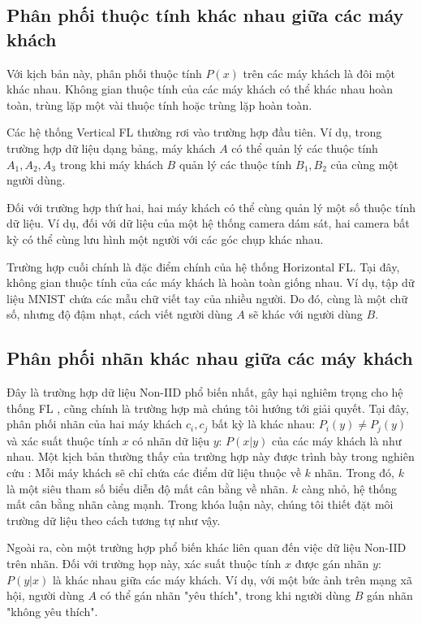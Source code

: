 \subsection{Phân phối thuộc tính khác nhau giữa các máy khách}

Với kịch bản này, phân phối thuộc tính $P(x)$ trên các máy khách là đôi một khác nhau. Không gian thuộc tính của các máy khách có thể khác nhau hoàn toàn, trùng lặp một vài thuộc tính hoặc trùng lặp hoàn toàn.

Các hệ thống Vertical FL thường rơi vào trường hợp đầu tiên. Ví dụ, trong trường hợp dữ liệu dạng bảng, máy khách $A$ có thể quản lý các thuộc tính $A_1, A_2, A_3$ trong khi máy khách $B$ quản lý các thuộc tính $B_1, B_2$ của cùng một người dùng.

Đối với trường hợp thứ hai, hai máy khách có thể cùng quản lý một số thuộc tính dữ liệu. Ví dụ, đối với dữ liệu của một hệ thống camera dám sát, hai camera bất kỳ có thể cùng lưu hình một người với các góc chụp khác nhau.

Trường hợp cuối chính là đặc điểm chính của hệ thống Horizontal FL. Tại đây, không gian thuộc tính của các máy khách là hoàn toàn giống nhau. Ví dụ, tập dữ liệu MNIST chứa các mẫu chữ viết tay của nhiều người. Do đó, cùng là một chữ số, nhưng độ đậm nhạt, cách viết người dùng $A$ sẽ khác với người dùng $B$.

\subsection{Phân phối nhãn khác nhau giữa các máy khách}

Đây là trường hợp dữ liệu Non-IID phổ biến nhất, gây hại nghiêm trọng cho hệ thống FL \cite{zhu2021federated}, cũng chính là trường hợp mà chúng tôi hướng tới giải quyết. Tại đây, phân phối nhãn của hai máy khách $c_i, c_j$ bất kỳ là khác nhau: $P_i(y) \ne P_j(y)$ và xác suất thuộc tính $x$ có nhãn dữ liệu $y$: $P(x|y)$ của các máy khách là như nhau. Một kịch bản thường thấy của trường hợp này được trình bày trong nghiên cứu \cite{mcmahan2017communication}: Mỗi máy khách sẽ chỉ chứa các điểm dữ liệu thuộc về $k$ nhãn. Trong đó, $k$ là một siêu tham số biểu diễn độ mất cân bằng về nhãn. $k$ càng nhỏ, hệ thống mất cân bằng nhãn càng mạnh. Trong khóa luận này, chúng tôi thiết đặt môi trường dữ liệu theo cách tương tự như vậy. 

Ngoài ra, còn một trường hợp phổ biến khác liên quan đến việc dữ liệu Non-IID trên nhãn. Đối với trường họp này, xác suất thuộc tính $x$ được gán nhãn $y$: $P(y|x)$ là khác nhau giữa các máy khách. Ví dụ, với một bức ảnh trên mạng xã hội, người dùng $A$ có thể gán nhãn "yêu thích", trong khi người dùng $B$ gán nhãn "không yêu thích".

